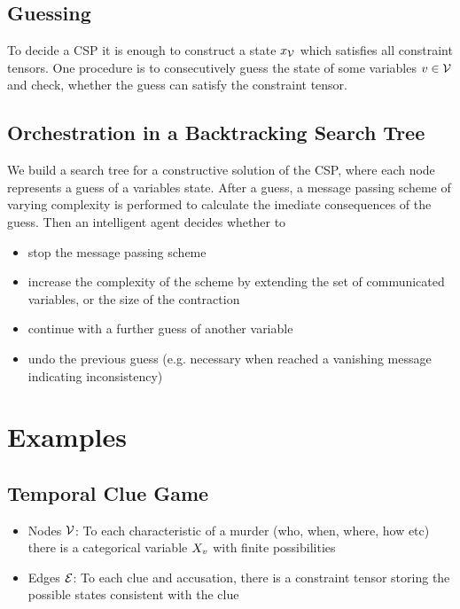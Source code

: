 \documentclass[aps,onecolumn,nofootinbib,pra]{article}
\begin{document}
    \subsection{Guessing}

    To decide a CSP it is enough to construct a state $x_{\mathcal{V}}$ which satisfies all constraint tensors.
    One procedure is to consecutively guess the state of some variables $v\in\mathcal{V}$ and check, whether the guess can satisfy the constraint tensor.

    \subsection{Orchestration in a Backtracking Search Tree}

    We build a search tree for a constructive solution of the CSP, where each node represents a guess of a variables state.
    After a guess, a message passing scheme of varying complexity is performed to calculate the imediate consequences of the guess.
    Then an intelligent agent decides whether to
    \begin{itemize}
        \item stop the message passing scheme
        \item increase the complexity of the scheme by extending the set of communicated variables, or the size of the contraction
        \item continue with a further guess of another variable
        \item undo the previous guess (e.g. necessary when reached a vanishing message indicating inconsistency)
    \end{itemize}


    \section{Examples}

    \subsection{Temporal Clue Game}

    \begin{itemize}
        \item Nodes $\mathcal{V}$: To each characteristic of a murder (who, when, where, how etc) there is a categorical variable $X_{v}$ with finite possibilities
        \item Edges $\mathcal{E}$: To each clue and accusation, there is a constraint tensor storing the possible states consistent with the clue
    \end{itemize}
\end{document}
